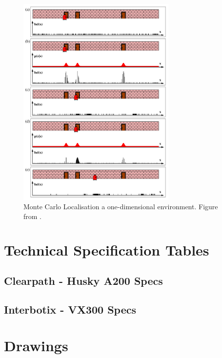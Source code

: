 \begin{figure}[htp]
  \centering
  \includegraphics[width = 0.7\textwidth]{Figures/figMCL.pdf}
  \caption{Monte Carlo Localisation a one-dimensional environment. Figure from \cite{ThrunSebastian2005Pr}.}
  \label{fig:monteCarloLocalisation}
\end{figure}

\chapter{Technical Specification Tables}

\section{Clearpath - Husky A200 Specs} 


\section{Interbotix - VX300 Specs}



\chapter{Drawings}

